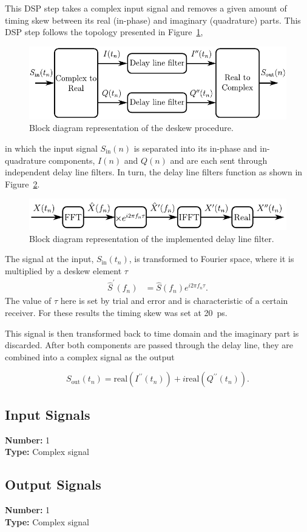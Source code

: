 This DSP step takes a complex input signal and removes a given amount of timing skew between its real (in-phase) and imaginary (quadrature) parts. This DSP step follows the topology presented in Figure~\ref{fig:mqamDiagramDSP_DS},
%
\begin{figure}[h]
\centering
\includegraphics[scale=1]{./lib/timing_deskew/figures/diagramDSP_DS}
\caption{Block diagram representation of the deskew procedure.}
\label{fig:mqamDiagramDSP_DS}
\end{figure}
%
in which the input signal $S_\text{in}(n)$ is separated into its in-phase and in-quadrature components, $I(n)$ and $Q(n)$ and are each sent through independent delay line filters. In turn, the delay line filters function as shown in Figure~\ref{fig:mqamDiagramDSP_DL}.
%
\begin{figure}[h]
\centering
\includegraphics[scale=1]{./lib/timing_deskew/figures/diagramDSP_DL}
\caption{Block diagram representation of the implemented delay line filter.}
\label{fig:mqamDiagramDSP_DL}
\end{figure}
%
The signal at the input, $S_\text{in}(t_n)$, is transformed to Fourier space, where it is multiplied by a deskew element $\tau$
%
\begin{align}
\hat{S}^\prime(f_n)&=\hat{S}(f_n) e^{i2\pi f_n \tau}.
\end{align}
The value of $\tau$ here is set by trial and error and is characteristic of a certain receiver. For these results the timing skew was set at 20~ps.
\par
This signal is then transformed back to time domain and the imaginary part is discarded. After both components are passed through the delay line, they are combined into a complex signal as the output

\begin{equation}
S_\text{out}(t_n)=\text{real}(I^{\prime\prime}(t_n))+i\text{real}(Q^{\prime\prime}(t_n)).
\end{equation}

\subsection*{Input Signals}

\textbf{Number:} 1\\
\textbf{Type:} Complex signal

\subsection*{Output Signals}

\textbf{Number:} 1\\
\textbf{Type:} Complex signal

